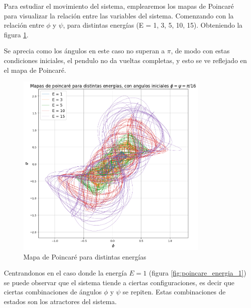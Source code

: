 \documentclass[11pt, twoside]{article} %
\begin{document}
Para estudiar el movimiento del sistema, emplearemos los mapas de 
Poincaré para visualizar la relación entre las variables del sistema. 
Comenzando con la relación entre $\phi$ y $\psi$, para distintas 
energías (E = 1, 3, 5, 10, 15). Obteniendo la figura 
\ref{fig:poincare_energias}.

Se aprecia como los ángulos en este caso no superan a $\pi$, de modo
con estas condiciones iniciales, el pendulo no da vueltas completas, 
y esto se ve reflejado en el mapa de Poincaré. 
\begin{figure}[h!]
    \centering
    \includegraphics[width=0.85\textwidth]{plots/poincare_energias.png}
    \caption{Mapa de Poincaré para distintas energías}
    \label{fig:poincare_energias}
\end{figure}

Centrandonos en el caso donde la energía $E = 1$ 
(figura \ref{fig:poincare_energia_1}) se puede observar que el sistema 
tiende a ciertas configuraciones, es decir que ciertas combinaciones de 
ángulos $\phi$ y $\psi$ se repiten. Estas combinaciones de estados son 
los atractores del sistema.
\end{document}
